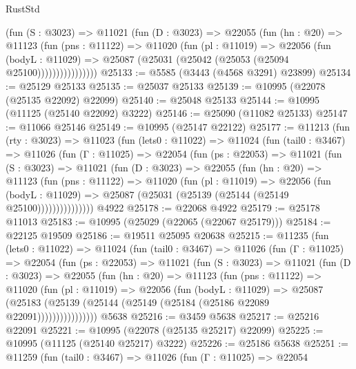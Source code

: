 \begin{lexlean}{RustStd}
\begin{coremodule}
                (fun (S : @3023) =>
                @11021
                  (fun (D : @3023) =>
                  @22055
                    (fun (hn : @20) =>
                    @11123
                      (fun (pns : @11122) =>
                      @11020
                        (fun (pl : @11019) =>
                        @22056
                          (fun (bodyL : @11029) =>
                          @25087 (@25031 (@25042 (@25053 (@25094 @25100))))))))))))))))
@25133 := @5585 (@3443 (@4568 @3291) @23899)
@25134 := @25129 @25133
@25135 := @25037 @25133
@25139 := @10995 (@22078 (@25135 @22092) @22099)
@25140 := @25048 @25133
@25144 := @10995 (@11125 (@25140 @22092) @3222)
@25146 := @25090 (@11082 @25133)
@25147 := @11066 @25146
@25149 := @10995 (@25147 @22122)
@25177 := @11213
    (fun (rty : @3023) =>
    @11023
      (fun (lets0 : @11022) =>
      @11024
        (fun (tail0 : @3467) =>
        @11026
          (fun (Γ : @11025) =>
          @22054
            (fun (ps : @22053) =>
            @11021
              (fun (S : @3023) =>
              @11021
                (fun (D : @3023) =>
                @22055
                  (fun (hn : @20) =>
                  @11123
                    (fun (pns : @11122) =>
                    @11020
                      (fun (pl : @11019) =>
                      @22056
                        (fun (bodyL : @11029) =>
                        @25087 (@25031 (@25139 (@25144 (@25149 @25100)))))))))))))))
    @4922
@25178 := @22068 @4922
@25179 := @25178 @11013
@25183 := @10995 (@25029 (@22065 (@22067 @25179)))
@25184 := @22125 @19509
@25186 := @19511 @25095 @20638
@25215 := @11235
    (fun (lets0 : @11022) =>
    @11024
      (fun (tail0 : @3467) =>
      @11026
        (fun (Γ : @11025) =>
        @22054
          (fun (ps : @22053) =>
          @11021
            (fun (S : @3023) =>
            @11021
              (fun (D : @3023) =>
              @22055
                (fun (hn : @20) =>
                @11123
                  (fun (pns : @11122) =>
                  @11020
                    (fun (pl : @11019) =>
                    @22056
                      (fun (bodyL : @11029) =>
                      @25087
                        (@25183
                          (@25139 (@25144 (@25149 (@25184 (@25186 @22089 @22091))))))))))))))))
    @5638
@25216 := @3459 @5638
@25217 := @25216 @22091
@25221 := @10995 (@22078 (@25135 @25217) @22099)
@25225 := @10995 (@11125 (@25140 @25217) @3222)
@25226 := @25186 @5638
@25251 := @11259
    (fun (tail0 : @3467) =>
    @11026
      (fun (Γ : @11025) =>
      @22054

\end{coremodule}
\end{lexlean}
